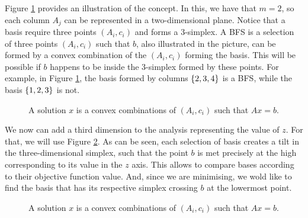 Figure \ref{p1c4:fig:column_geometry} provides an illustration of the concept. In this, we have that $m=2$, so each column $A_j$ can be represented in a two-dimensional plane. Notice that a basis require three points $(A_i,c_i)$ and forms a 3-simplex. A BFS is a selection of three points $(A_i,c_i)$ such that $b$, also illustrated in the picture, can be formed by a convex combination of the $(A_i,c_i)$ forming the basis. This will be possible if $b$ happens to be inside the 3-simplex formed by these points. For example, in Figure \ref{p1c4:fig:column_geometry}, the basis formed by columns $\left\{ 2,3,4 \right \}$ is a BFS, while the basis $\left\{ 1,2,3 \right \}$ is not.

\begin{figure}[h]
	\caption{A solution $x$ is a convex combinations of $(A_i,c_i)$ such that $Ax= b$.} \label{p1c4:fig:column_geometry}
\end{figure}	 

We now can add a third dimension to the analysis representing the value of $z$. For that, we will use Figure \ref{p1c4:fig:column_geometry_3d}. As can be seen, each selection of basis creates a tilt in the three-dimensional simplex, such that the point $b$ is met precisely at the high corresponding to its value in the $z$ axis. This allows to compare bases according to their objective function value. And, since we are minimising, we wold like to find the basis that has its respective simplex crossing $b$ at the lowermost point.

\begin{figure}[h]
	\caption{A solution $x$ is a convex combinations of $(A_i,c_i)$ such that $Ax= b$.} \label{p1c4:fig:column_geometry_3d}
\end{figure}	

